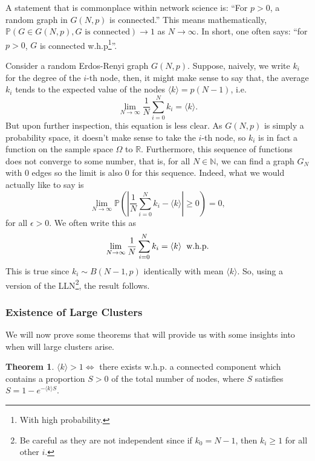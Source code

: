 \documentclass[
]{article}
\theoremstyle{definition}
\newtheorem{theorem}{Theorem}
\theoremstyle{definition}
\begin{document}
A statement that is commonplace within network science is: ``For
\(p > 0\), a random graph in \(G(N, p)\) is connected.'' This means
mathematically,
\(\mathbb{P}(G \in G(N, p), G \text{ is connected}) \to 1\) as
\(N \to \infty\). In short, one often says: ``for \(p > 0\), \(G\) is
connected w.h.p\footnote{With high probability.}''.

Consider a random Erdos-Renyi graph \(G(N, p)\). Suppose, naively, we
write \(k_i\) for the degree of the \(i\)-th node, then, it might make
sense to say that, the average \(k_i\) tends to the expected value of
the nodes \(\langle k \rangle = p(N - 1)\), i.e.
\[\lim_{N \to \infty} \frac{1}{N} \sum_{i = 0}^N k_i = \langle k \rangle.\]
But upon further inspection, this equation is less clear. As \(G(N, p)\)
is simply a probability space, it doesn't make sense to take the
\(i\)-th node, so \(k_i\) is in fact a function on the sample space
\(\Omega\) to \(\mathbb{R}\). Furthermore, this sequence of functions
does not converge to some number, that is, for all \(N \in \mathbb{N}\),
we can find a graph \(G_N\) with \(0\) edges so the limit is also \(0\)
for this sequence. Indeed, what we would actually like to say is
\[\lim_{N \to \infty} \mathbb{P} \left( \left| \frac{1}{N}\sum_{i = 0}^N k_i - 
  \langle k \rangle \right| \ge 0 \right) = 0, \] for all
\(\epsilon > 0\). We often write this as
\[\lim_{N \to \infty} \frac{1}{N} \sum_{i = 0}^N k_i = \langle k \rangle 
  \hspace{2mm} \text{w.h.p}.\] This is true since
\(k_i \sim B(N - 1, p)\) identically with mean \(\langle k \rangle\).
So, using a version of the
LLN\footnote{Be careful as they are not independent 
since if \(k_0 = N - 1\), then \(k_i \ge 1\) for all other \(i\).}, the
result follows.

\hypertarget{existence-of-large-clusters}{%
\subsubsection{Existence of Large
Clusters}\label{existence-of-large-clusters}}

We will now prove some theorems that will provide us with some insights
into when will large clusters arise.

\begin{theorem}
  \(\langle k \rangle > 1 \iff\) there exists w.h.p. a connected component which 
  contains a proportion \(S > 0\) of the total number of nodes, where \(S\) 
  satisfies \(S = 1 - e^{-\langle k \rangle S}\).
\end{theorem}
\end{document}

